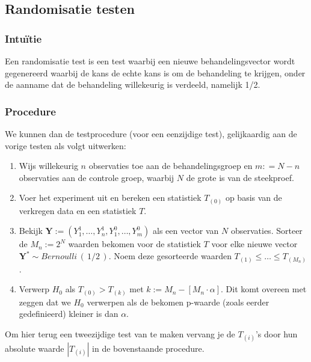 \documentclass[12pt, a4paper, faculty=we]{ugent-doc}
\begin{document}
\subsection{Randomisatie testen}

\subsubsection{Intuïtie}
\begin{flushleft}
    Een randomisatie test is een test waarbij een nieuwe behandelingsvector wordt gegenereerd waarbij de kans de echte kans is om
    de behandeling te krijgen, onder de aanname dat de behandeling willekeurig is verdeeld, namelijk 1/2. 
\end{flushleft}

\subsubsection{Procedure}

\begin{flushleft}
    We kunnen dan de testprocedure (voor een eenzijdige test), gelijkaardig aan de vorige testen als volgt uitwerken:
    \begin{enumerate}
        \item Wijs willekeurig \(n\) observaties toe aan de behandelingsgroep en \(m : = N-n\) observaties aan de controle groep, waarbij $N$ de grote is van de steekproef.
        \item Voer het experiment uit en bereken een statistiek \(T_{(0)}\) op basis van de verkregen data en een statistiek \(T\).
        \item Bekijk \(\mathbf{Y} := (Y^1_1, \ldots, Y^1_n, Y^0_1, \ldots, Y^0_m)\) als een vector van \(N\) observaties. Sorteer de \(M_n := 2^N\) 
        waarden bekomen voor de statistiek \(T\) voor elke nieuwe vector \(\mathbf{Y}^* \sim  Bernoulli \, ( \, 1/2 \, )\).
        Noem deze gesorteerde waarden 
        \(T_{(1)}  \leq \ldots \leq T_{(M_n)}\).
        \item Verwerp \(H_0\) als \(T_{(0)} > T_{(k)}\) met \(k:= M_n-[M_n\cdot\alpha]\). Dit komt overeen met zeggen dat we \(H_0\) verwerpen als 
        de bekomen p-waarde (zoals eerder gedefinieerd) kleiner is dan \(\alpha\).
    \end{enumerate}
\end{flushleft}

\begin{flushleft}
    Om hier terug een tweezijdige test van te maken vervang je de \(T_{(i)}\)'s door hun absolute waarde \(|T_{(i)}|\) in de bovenstaande procedure.
\end{flushleft}
\end{document}
